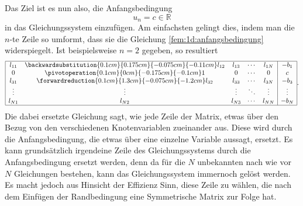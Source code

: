 Das Ziel ist es nun also, die Anfangsbedingung
\begin{equation}
    u_n = c \in \mathbb{R} 
    \label{fem:1d:anfangsbedingung}
\end{equation}
in das Gleichungssystem einzufügen.
Am einfachsten gelingt dies, indem man die $n$-te Zeile so umformt, dass sie die Gleichung \ref{fem:1d:anfangsbedingung} widerspiegelt.
Ist beispielsweise $n = 2$ gegeben, so resultiert
\begin{equation}
    \begin{array}{|ccccc|c|}
        \hline
        l_{11} & 
        \backwardsubstitution{0.1cm}{0.175cm}{-0.075cm}{-0.11cm}
                 l_{12} & l_{13} & \cdots & l_{1N} & -b_1   \\
        0      & 
        \pivotoperation{0.1cm}{0cm}{-0.175cm}{-0.1cm}
                 1      & 0      & \cdots & 0      & c      \\
        l_{31} & 
        \forwardreduction{0.1cm}{1.3cm}{-0.075cm}{-1.2cm}
                 l_{32} & l_{33} & \cdots & l_{3N} & -b_3   \\
        \vdots & \vdots & \vdots & \ddots & \vdots & \vdots \\
        l_{N1} & l_{N2} & l_{N3} & \cdots & l_{NN} & -b_N   \\
        \hline
    \end{array}.
\end{equation}
Die dabei ersetzte Gleichung sagt, wie jede Zeile der Matrix, etwas über den Bezug von den verschiedenen Knotenvariablen zueinander aus.
Diese wird durch die Anfangsbedingung, die etwas über eine einzelne Variable aussagt, ersetzt.
Es kann grundsätzlich irgendeine Zeile des Gleichungssystems durch die Anfangsbedingung ersetzt werden, denn da für die $N$ unbekannten nach wie vor $N$ Gleichungen bestehen, kann das Gleichungssystem immernoch gelöst werden.
Es macht jedoch aus Hinsicht der Effizienz Sinn, diese Zeile zu wählen, die nach dem Einfügen der Randbedingung eine Symmetrische Matrix zur Folge hat.

